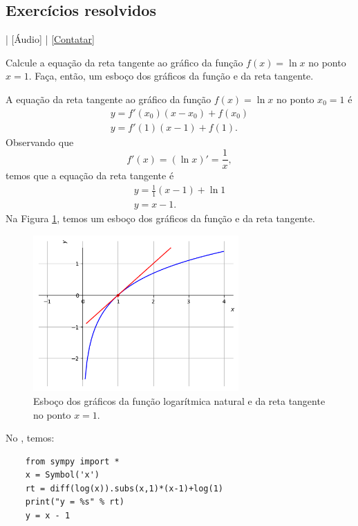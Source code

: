 \subsection*{Exercícios resolvidos}

\begin{flushright}
  [Vídeo] | [Áudio] | \href{https://phkonzen.github.io/notas/contato.html}{[Contatar]}
\end{flushright}

\begin{exeresol}
  Calcule a equação da reta tangente ao gráfico da função $f(x) = \ln x$ no ponto $x=1$. Faça, então, um esboço dos gráficos da função e da reta tangente.
\end{exeresol}
\begin{resol}
  A equação da reta tangente ao gráfico da função $f(x) = \ln x$ no ponto $x_0=1$ é
  \begin{gather}
    y = f'(x_0)(x-x_0)+f(x_0) \\
    y = f'(1)(x-1)+f(1).
  \end{gather}
  Observando que
  \begin{equation}
    f'(x) = (\ln x)' = \frac{1}{x},
  \end{equation}
  temos que a equação da reta tangente é
  \begin{gather}
    y = \frac{1}{1}(x-1)+\ln 1 \\
    y = x-1.
  \end{gather}
  Na Figura \ref{fig:deriv_exeresol_rt_ln}, temos um esboço dos gráficos da função e da reta tangente.

  \begin{figure}[H]
    \centering
    \includegraphics[width=0.7\textwidth]{./cap_deriv/dados/fig_deriv_exeresol_rt_ln/fig_deriv_exeresol_rt_ln}
    \caption{Esboço dos gráficos da função logarítmica natural e da reta tangente no ponto $x=1$.}
    \label{fig:deriv_exeresol_rt_ln}
  \end{figure}

  \ifispython
  No \sympy, temos:
  \begin{lstlisting}
    from sympy import *
    x = Symbol('x')
    rt = diff(log(x)).subs(x,1)*(x-1)+log(1)
    print("y = %s" % rt)
    y = x - 1
  \end{lstlisting}
  \fi    
\end{resol}

